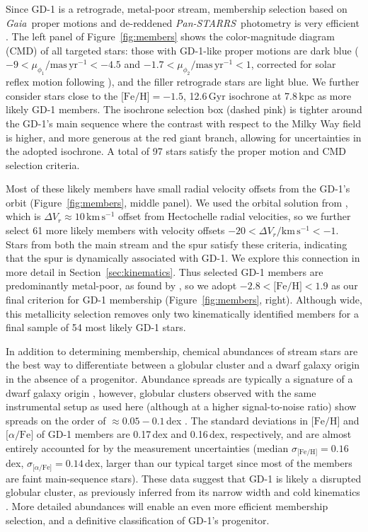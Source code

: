 \documentclass[twocolumn]{aastex63}
\newcommand{\gaia}{\textsl{Gaia}}
\newcommand{\pans}{\textsl{Pan-STARRS}}
\newcommand{\kms}{\ensuremath{\textrm{km}\,\textrm{s}^{-1}}}
\newcommand{\masyr}{\ensuremath{\textrm{mas}\,\textrm{yr}^{-1}}}
\newcommand{\feh}{\ensuremath{\textrm{[Fe/H]}}}
\newcommand{\afe}{\ensuremath{\textrm{[$\alpha$/Fe]}}}
\begin{document}
Since GD-1 is a retrograde, metal-poor stream, membership selection based on \gaia\ proper motions \citep{gdr2} and de-reddened \pans\ photometry \citep{sfd, ps1} is very efficient \citep[e.g.,][]{pwb}.
The left panel of Figure~\ref{fig:members} shows the color-magnitude diagram (CMD) of all targeted stars: those with GD-1-like proper motions are dark blue ($-9<\mu_{\phi_1}/\masyr<-4.5$ and $-1.7<\mu_{\phi_2}/\masyr<1$, corrected for solar reflex motion following \citealt{pwb}), and the filler retrograde stars are light blue.
We further consider stars close to the $\textrm{[Fe/H]}=-1.5$, 12.6\,Gyr isochrone at 7.8\,kpc \citep{choi2016} as more likely GD-1 members.
The isochrone selection box (dashed pink) is tighter around the GD-1's main sequence where the contrast with respect to the Milky Way field is higher, and more generous at the red giant branch, allowing for uncertainties in the adopted isochrone.
A total of 97 stars satisfy the proper motion and CMD selection criteria.

Most of these likely members have small radial velocity offsets from the GD-1's orbit (Figure~\ref{fig:members}, middle panel).
We used the orbital solution from \citet{pwb}, which is $\Delta V_r\approx10\,\kms$ offset from Hectochelle radial velocities, so we further select 61 more likely members with velocity offsets $-20 < \Delta V_r / \kms < -1$.
Stars from both the main stream and the spur satisfy these criteria, indicating that the spur is dynamically associated with GD-1.
We explore this connection in more detail in Section~\ref{sec:kinematics}.
% 
Thus selected GD-1 members are predominantly metal-poor, as found by \citet{malhan2019}, so we adopt $-2.8<\feh<1.9$ as our final criterion for GD-1 membership (Figure~\ref{fig:members}, right).
Although wide, this metallicity selection removes only two kinematically identified members for a final sample of 54 most likely GD-1 stars.

In addition to determining membership, chemical abundances of stream stars are the best way to differentiate between a globular cluster and a dwarf galaxy origin in the absence of a progenitor.
Abundance spreads are typically a signature of a dwarf galaxy origin \citep[e.g.,][]{willman2012}, however, globular clusters observed with the same instrumental setup as used here (although at a higher signal-to-noise ratio) show spreads on the order of $\approx0.05-0.1$\,dex \citep{cargile2019}.
The standard deviations in $\feh$ and $\afe$ of GD-1 members are 0.17\,dex and 0.16\,dex, respectively, and are almost entirely accounted for by the measurement uncertainties (median $\sigma_\feh=0.16$\,dex, $\sigma_\afe=0.14$\,dex, larger than our typical target since most of the members are faint main-sequence stars).
These data suggest that GD-1 is likely a disrupted globular cluster, as previously inferred from its narrow width \citep[e.g.,][]{grillmair2006} and cold kinematics \citep[e.g.,][]{malhan2019}.
More detailed abundances will enable an even more efficient membership selection, and a definitive classification of GD-1's progenitor.
\end{document}
